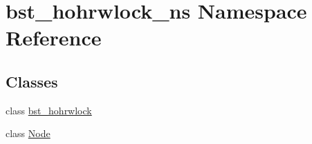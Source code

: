 \hypertarget{namespacebst__hohrwlock__ns}{}\section{bst\+\_\+hohrwlock\+\_\+ns Namespace Reference}
\label{namespacebst__hohrwlock__ns}
\subsection*{Classes}
\begin{DoxyCompactItemize}
\item 
class \hyperlink{classbst__hohrwlock__ns_1_1bst__hohrwlock}{bst\+\_\+hohrwlock}
\item 
class \hyperlink{classbst__hohrwlock__ns_1_1Node}{Node}
\end{DoxyCompactItemize}
